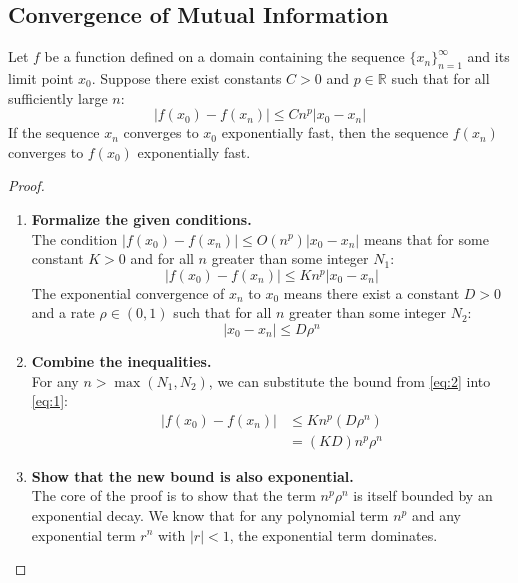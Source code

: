 \documentclass[../../main.tex]{subfiles}
\begin{document}
\pagebreak
\subsection{Convergence of Mutual Information}
\begin{theorem}
Let $f$ be a function defined on a domain containing the sequence $\{x_n\}_{n=1}^\infty$ and its limit point $x_0$. Suppose there exist constants $C > 0$ and $p \in \mathbb{R}$ such that for all sufficiently large $n$:
\[
    |f(x_0) - f(x_n)| \le C n^p |x_0 - x_n|
\]
If the sequence $x_n$ converges to $x_0$ exponentially fast, then the sequence $f(x_n)$ converges to $f(x_0)$ exponentially fast.
\end{theorem}

\begin{proof}
\begin{enumerate}
    \item \textbf{Formalize the given conditions.} \\
    The condition $|f(x_0) - f(x_n)| \le O(n^p)|x_0 - x_n|$ means that for some constant $K > 0$ and for all $n$ greater than some integer $N_1$:
    \begin{equation}
        |f(x_0) - f(x_n)| \le K n^p |x_0 - x_n| \label{eq:1}
    \end{equation}
    The exponential convergence of $x_n$ to $x_0$ means there exist a constant $D > 0$ and a rate $\rho \in (0, 1)$ such that for all $n$ greater than some integer $N_2$:
    \begin{equation}
        |x_0 - x_n| \le D \rho^n \label{eq:2}
    \end{equation}

    \item \textbf{Combine the inequalities.} \\
    For any $n > \max(N_1, N_2)$, we can substitute the bound from \eqref{eq:2} into \eqref{eq:1}:
    \begin{align*}
        |f(x_0) - f(x_n)| &\le K n^p \left( D \rho^n \right) \\
        &= (KD) n^p \rho^n
    \end{align*}

    \item \textbf{Show that the new bound is also exponential.} \\
    The core of the proof is to show that the term $n^p \rho^n$ is itself bounded by an exponential decay. We know that for any polynomial term $n^p$ and any exponential term $r^n$ with $|r| < 1$, the exponential term dominates.


\end{enumerate}
\end{proof}
\end{document}
